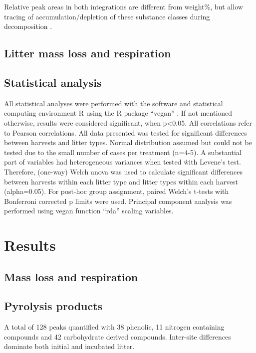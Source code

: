 \documentclass[preprint,review,12pt]{elsarticle}
\begin{document}
Relative peak areas in both integrations are different from weight\%, but allow tracing of accumulation/depletion of these substance classes during decomposition \citep{Kuder1998}. 

\subsection{Litter mass loss and respiration}

\subsection{Statistical analysis}
All statistical analyses were performed with the software and statistical computing environment R using the R package ``vegan'' \citep{Oksanen2011}. If not mentioned otherwise, results were considered significant, when p\textless 0.05. All correlations refer to Pearson correlations.
All data presented was tested for significant differences between harvests and litter types. Normal distribution assumed but could not be tested due to the small number of cases per treatment (n=4-5). A substantial part of variables had heterogeneous variances when tested ẃith Levene's test. Therefore, (one-way) Welch anova was used to calculate significant differences between harvests within each litter type and litter types within each harvest (alpha=0.05). For post-hoc group assignment, paired Welch's t-tests with Bonferroni corrected p limits were used. Principal component analysis was performed using vegan function ``rda'' scaling variables.

\section{Results}

\subsection{Mass loss and respiration}

\subsection{Pyrolysis products}

A total of 128 peaks quantified with 38 phenolic, 11 nitrogen containing compounds and 42 carbohydrate derived compounds. Inter-site differences dominate both initial and incubated litter. 
\end{document}

